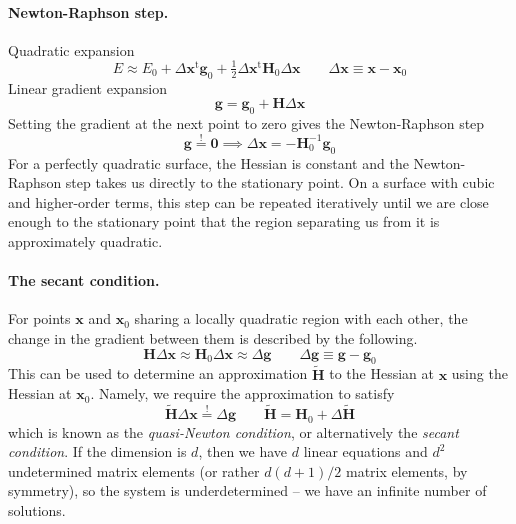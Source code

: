\documentclass[11pt]{article}
\begin{document}
\paragraph{Newton-Raphson step.}
Quadratic expansion
\[
    E
    \approx
    E_0
    +
    \Delta\mathbf{x}^\mathrm{t}
    \mathbf{g}_0
    +
    \tfrac{1}{2}
    \Delta\mathbf{x}^\mathrm{t}
    \mathbf{H}_0
    \Delta\mathbf{x}
    \qquad
    \Delta\mathbf{x}
    \equiv
    \mathbf{x}
    -
    \mathbf{x}_0
\]
Linear gradient expansion
\[
    \mathbf{g}
    =
    \mathbf{g}_0
    +
    \mathbf{H}
    \Delta\mathbf{x}
\]
Setting the gradient at the next point to zero gives the Newton-Raphson step
\[
    \mathbf{g}
    \overset{!}{=}
    \mathbf{0}
    \implies
    \Delta\mathbf{x}
    =
    -
    \mathbf{H}_0^{-1}
    \mathbf{g}_0
\]
For a perfectly quadratic surface, the Hessian is constant and the
Newton-Raphson step takes us directly to the stationary point.
On a surface with cubic and higher-order terms, this step can be repeated
iteratively until we are close enough to the stationary point that the region
separating us from it is approximately quadratic.


\paragraph{The secant condition.}
For points
\(
    \mathbf{x}
\)
and
\(
    \mathbf{x}_0
\)
sharing a locally quadratic region with each other, the change in the gradient
between them is described by the following.
\[
    \mathbf{H}
    \Delta\mathbf{x}
    \approx
    \mathbf{H}_0
    \Delta\mathbf{x}
    \approx
    \Delta\mathbf{g}
    \qquad
    \Delta\mathbf{g}
    \equiv
    \mathbf{g} - \mathbf{g}_0
\]
This can be used to determine an approximation
\(
    \tilde{\mathbf{H}}
\)
to the Hessian at
\(
    \mathbf{x}
\)
using the Hessian at
\(
    \mathbf{x}_0
\).
Namely, we require the approximation to satisfy
\[
    \tilde{\mathbf{H}}
    \Delta\mathbf{x}
    \overset{!}{=}
    \Delta\mathbf{g}
    \qquad
    \tilde{\mathbf{H}}
    =
    \mathbf{H}_0
    +
    \Delta\tilde{\mathbf{H}}
\]
which is known as the {\itshape quasi-Newton condition}, or alternatively the
{\itshape secant condition}.
If the dimension is \(d\), then we have \(d\) linear equations and \(d^2\)
undetermined matrix elements (or rather \(d(d+1)/2\) matrix elements, by
symmetry), so the system is underdetermined -- we have an infinite number of
solutions.
\end{document}
